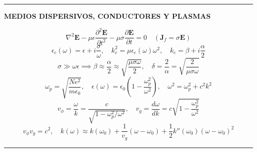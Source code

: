 \documentclass[twocolumn]{article}
\begin{document}
	\vspace{-2mm}\hrule\vspace{1mm}
	
	\begin{center}\textbf{\footnotesize MEDIOS DISPERSIVOS, CONDUCTORES Y PLASMAS}\end{center}
	\vspace{-2mm}
	\begin{equation*}
		\nabla^2\mathbf{E} - \mu\epsilon\frac{\partial^2\mathbf{E}}{\partial t^2} - \mu\sigma\frac{\partial\mathbf{E}}{\partial t} = 0 \quad (\mathbf{J}_f = \sigma\mathbf{E})
	\end{equation*}
	\begin{equation*}
		\epsilon_c(\omega) = \epsilon + i\frac{\sigma}{\omega}, \quad k_c^2 = \mu\epsilon_c(\omega)\omega^2, \quad k_c = \beta + i\frac{\alpha}{2}
	\end{equation*}
	\begin{equation*}
		\sigma \gg \omega\epsilon \implies \beta \approx \frac{\alpha}{2} \approx \sqrt{\frac{\mu\sigma\omega}{2}}, \quad \delta = \frac{2}{\alpha} = \sqrt{\frac{2}{\mu\sigma\omega}}
	\end{equation*}
	\begin{equation*}
		\omega_p = \sqrt{\frac{N e^2}{m \epsilon_0}}, \quad \epsilon(\omega) = \epsilon_0\left(1 - \frac{\omega_p^2}{\omega^2}\right), \quad \omega^2 = \omega_p^2 + c^2 k^2
	\end{equation*}
	\begin{equation*}
		v_\phi = \frac{\omega}{k} = \frac{c}{\sqrt{1 - \omega_p^2/\omega^2}}, \quad v_g = \frac{d\omega}{dk} = c\sqrt{1 - \frac{\omega_p^2}{\omega^2}}
	\end{equation*}
	\begin{equation*}
		v_\phi v_g = c^2, \quad k(\omega) \approx k(\omega_0) + \frac{1}{v_g}(\omega - \omega_0) + \frac{1}{2}k''(\omega_0)(\omega - \omega_0)^2
	\end{equation*}
	
	\vspace{-2mm}\hrule\vspace{1mm}
	
\end{document}
